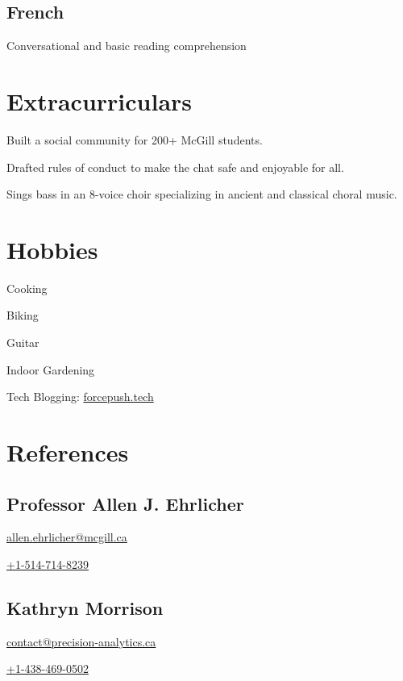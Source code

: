 \documentclass[]{jidicula-resume}
\begin{document}
\subsection{French}
Conversational and basic reading comprehension
\sectionsep

\section{Extracurriculars}
 
\vspace{\topsep}
\begin{tightemize}
\item Built a social community for 200+ McGill students.
\item Drafted rules of conduct to make the chat safe and enjoyable for all.
\end{tightemize}
\sectionsep
{} 
\vspace{\topsep}
\begin{tightemize}
\item Sings bass in an 8-voice choir specializing in ancient and classical choral music.
\end{tightemize}
\sectionsep

\section{Hobbies}
\sectionsep
\begin{tightemize}
\item Cooking
\item Biking
\item Guitar
\item Indoor Gardening
\item Tech Blogging: \href{http://bit.ly/jidicula-site}{forcepush.tech}
\end{tightemize}
\sectionsep

\section{References}
\subsection{Professor Allen J. Ehrlicher}
\href{mailto:allen.ehrlicher@mcgill.ca}{allen.ehrlicher@mcgill.ca}

\href{tel:15147148239}{+1-514-714-8239}
\sectionsep

\subsection{Kathryn Morrison}
\href{mailto:contact@precision-analytics.ca}{contact@precision-analytics.ca}

\href{tel:14384690502}{+1-438-469-0502}
\sectionsep
\end{document}
